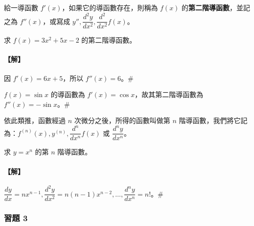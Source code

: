 給一導函數 $f'(x)$，如果它的導函數存在，則稱為 $f(x)$ 的\textbf{第二階導函數}，並記之為 $f''(x)$，或寫成 $y'', \dfrac{d^2 y}{dx^2}, \dfrac{d^2}{dx^2}f(x)$。

\begin{example}\label{ex:b6s-app4-15}
求 $f(x)=3x^2+5x-2$ 的第二階導函數。
\end{example}

\paragraph{【解】}
因 $f'(x)=6x+5$，所以 $f''(x)=6$。\hfill$\#$

\begin{example}\label{ex:b6s-app4-16}
$f(x)=\sin x$ 的導函數為 $f'(x)=\cos x$，故其第二階導函數為 $f''(x)=-\sin x$。\hfill$\#$
\end{example}

依此類推，函數經過 $n$ 次微分之後，所得的函數叫做第 $n$ 階導函數，我們將它記為：$f^{(n)}(x), y^{(n)}, \dfrac{d^n}{dx^n}f(x)$ 或 $\dfrac{d^n y}{dx^n}$。

\begin{example}\label{ex:b6s-app4-17}
求 $y=x^n$ 的第 $n$ 階導函數。
\end{example}

\paragraph{【解】}
$\dfrac{dy}{dx} = nx^{n-1}, \dfrac{d^2 y}{dx^2} = n(n-1)x^{n-2}, \dots, \dfrac{d^n y}{dx^n} = n!$。\hfill$\#$

\subsubsection*{習題 3}\label{sec:b6s-ex-app4-3}

